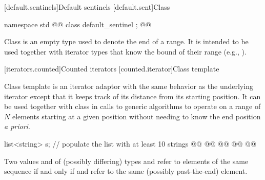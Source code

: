 \begin{addedblock}
[default.sentinels]{Default sentinels}
[default.sent]{Class }

%
\begin{itemdecl}
namespace std { @@
  class default_sentinel { };
}@\oldtxt{\}\}\}}@
\end{itemdecl}

\pnum
Class  is an empty type used to denote the end of a
range. It is intended to be used together with iterator types that know the bound
of their range (e.g., ).


[iterators.counted]{Counted iterators}
[counted.iterator]{Class template }

\pnum
Class template  is an iterator adaptor
with the same behavior as the underlying iterator except that it
keeps track of its distance from its starting position. It can be
used together with class  in calls to generic
algorithms to operate on a range of $N$ elements starting at a given
position without needing to know the end position \textit{a priori}.


\pnum
\begin{example}
\begin{codeblock}
list<string> s;
// populate the list  with at least 10 strings
@@
                 @@
@@
@@
@@
\end{codeblock}
\end{example}

\pnum
Two values  and  of (possibly differing) types
 and  refer to
elements of the same sequence if and only if 
and  refer to the same (possibly past-the-end) element.


\end{addedblock}

